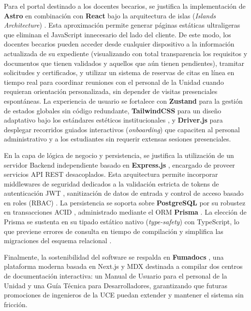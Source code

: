 Para el portal destinado a los docentes becarios, se justifica la implementación de \textbf{Astro} en combinación con \textbf{React} bajo la arquitectura de islas (\textit{Islands Architecture}) \cite{astro_docs}. Esta aproximación permite generar páginas estáticas ultraligeras que eliminan el JavaScript innecesario del lado del cliente. De este modo, los docentes becarios pueden acceder desde cualquier dispositivo a la información actualizada de su expediente (visualizando con total transparencia los requisitos y documentos que tienen validados y aquellos que aún tienen pendientes), tramitar solicitudes y certificados, y utilizar un sistema de reservas de citas en línea en tiempo real para coordinar reuniones con el personal de la Unidad cuando requieran orientación personalizada, sin depender de visitas presenciales espontáneas. La experiencia de usuario se fortalece con \textbf{Zustand} para la gestión de estados globales sin código redundante, \textbf{TailwindCSS} para un diseño adaptativo bajo los estándares estéticos institucionales \cite{tailwind_docs}, y \textbf{Driver.js} para desplegar recorridos guiados interactivos (\textit{onboarding}) que capaciten al personal administrativo y a los estudiantes sin requerir extensas sesiones presenciales.

En la capa de lógica de negocio y persistencia, se justifica la utilización de un servidor Backend independiente basado en \textbf{Express.js} \cite{express_docs}, encargado de proveer servicios API REST desacoplados. Esta arquitectura permite incorporar middlewares de seguridad dedicados a la validación estricta de tokens de autenticación JWT \cite{rfc_jwt}, sanitización de datos de entrada y control de acceso basado en roles (RBAC) \cite{ferraiolo_rbac}. La persistencia se soporta sobre \textbf{PostgreSQL} por su robustez en transacciones ACID \cite{postgresql_docs}, administrado mediante el ORM \textbf{Prisma} \cite{prisma_docs}. La elección de Prisma se sustenta en su tipado estático nativo (\textit{type-safety}) con TypeScript, lo que previene errores de consulta en tiempo de compilación y simplifica las migraciones del esquema relacional \cite{elmasri}.

Finalmente, la sostenibilidad del software se respalda en \textbf{Fumadocs} \cite{fumadocs_docs}, una plataforma moderna basada en Next.js y MDX destinada a compilar dos centros de documentación interactiva: un Manual de Usuario para el personal de la Unidad y una Guía Técnica para Desarrolladores, garantizando que futuras promociones de ingenieros de la UCE puedan extender y mantener el sistema sin fricción.

